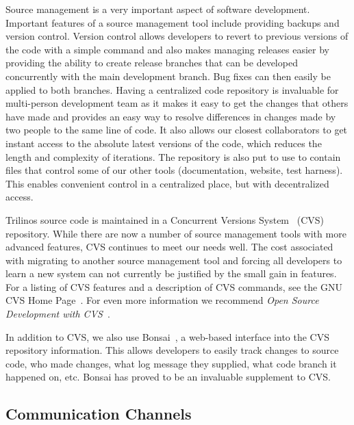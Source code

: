 \documentclass[12pt,relax]{article}
\begin{document}

Source management is a very important aspect of software development. 
Important features of a source management tool include providing backups and
version control.  Version control allows developers to revert to previous
versions of the code with a simple command and also makes managing releases
easier by providing the ability to create release branches that can be
developed concurrently with the main development branch.  Bug fixes can then
easily be applied to both branches.  Having a centralized code repository is
invaluable for multi-person development team as it makes it easy to get the
changes that others have made and provides an easy way to resolve differences
in changes made by two people to the same line of code.  It also allows our
closest collaborators to get instant access to the absolute latest versions
of the code, which reduces the length and complexity of iterations.  The
repository is also put to use to contain files that control some of our other
tools (documentation, website, test harness).  This enables convenient control
in a centralized place, but with decentralized access.

Trilinos source code is maintained in a Concurrent Versions System~\cite{CVS}
(CVS) repository.  While there are now a number of source management tools
with more advanced features, CVS continues to meet our needs well.  The cost
associated with migrating to another source management tool and forcing all
developers to learn a new system can not currently be justified by the small
gain in features.  For a listing of CVS features and a description of 
CVS commands, see the GNU CVS Home Page~\cite{CVS}.  For even more information
we recommend {\it Open Source Development with CVS}~\cite{FogelBarCVS}.

In addition to CVS, we also use Bonsai~\cite{Bonsai}, a web-based interface into the CVS
repository information.  This allows developers to easily track changes to 
source code, who made changes, what log message they supplied, what code branch
it happened on, etc.  Bonsai has proved to be an invaluable supplement to CVS.

\subsection{Communication Channels}

\end{document}

